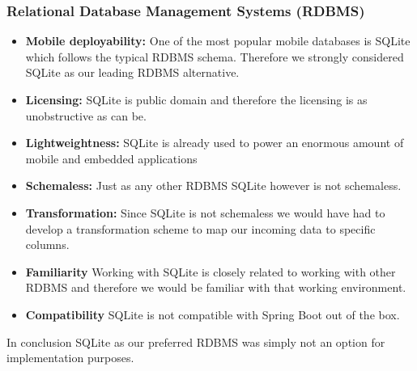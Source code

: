 \subsubsection{Relational Database Management Systems (RDBMS)}
\label{databaseRDBS}
\begin{itemize}
\item \label{rdbms_req_one} \textbf{Mobile deployability:}
One of the most popular mobile databases is SQLite which follows the typical RDBMS schema.\cite{dbcharts}
Therefore we strongly considered SQLite as our leading RDBMS alternative.
\item \label{rdbms_req_two} \textbf{Licensing:}
SQLite is public domain and therefore the licensing is as unobstructive as can be.
\item \label{rdbms_item_three} \textbf{Lightweightness:}
SQLite is already used to power an enormous amount of mobile and embedded applications\cite{sqlite}
\item \label{rdbms_req_four} \textbf{Schemaless:}
Just as any other RDBMS SQLite however is not schemaless.
\item \label{rdbms_req_five} \textbf{Transformation:}
Since SQLite is not schemaless we would have had to develop a transformation scheme to map our incoming data to specific columns.
\item \label{rdbms_req_six} \textbf{Familiarity}
Working with SQLite is closely related to working with other RDBMS and therefore we would be familiar with that working environment.
\item \label{rdbms_req_seven} \textbf{Compatibility}
SQLite is not compatible with Spring Boot out of the box.
\end{itemize}
In conclusion SQLite as our preferred RDBMS was simply not an option for implementation purposes.

